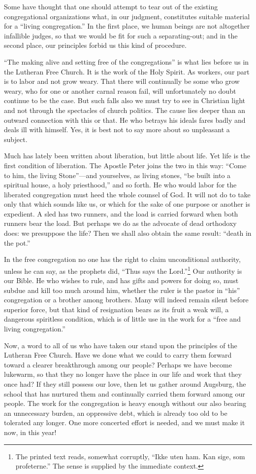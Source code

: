 Some have thought that one should attempt to tear out of the existing congregational organizations what, in our judgment, constitutes suitable material for a “living congregation.” In the first place, we human beings are not altogether infallible judges, so that we would be fit for such a separating-out; and in the second place, our principles forbid us this kind of procedure.

“The making alive and setting free of the congregations” is what lies before us in the Lutheran Free Church. It is the work of the Holy Spirit. As workers, our part is to labor and not grow weary. That there will continually be some who grow weary, who for one or another carnal reason fail, will unfortunately no doubt continue to be the case. But such falls also we must try to see in Christian light and not through the spectacles of church politics. The cause lies deeper than an outward connection with this or that. He who betrays his ideals fares badly and deals ill with himself. Yes, it is best not to say more about so unpleasant a subject.

Much has lately been written about liberation, but little about life. Yet life is the first condition of liberation. The Apostle Peter joins the two in this way: “Come to him, the living Stone”—and yourselves, as living stones, “be built into a spiritual house, a holy priesthood,” and so forth. He who would labor for the liberated congregation must heed the whole counsel of God. It will not do to take only that which sounds like us, or which for the sake of one purpose or another is expedient. A sled has two runners, and the load is carried forward when both runners bear the load. But perhaps we do as the advocate of dead orthodoxy does: we presuppose the life? Then we shall also obtain the same result: “death in the pot.”

In the free congregation no one has the right to claim unconditional authority, unless he can say, as the prophets did, ``Thus says the Lord.''\footnote{The printed text reads, somewhat corruptly, ``Ikke uten ham. Kan sige, som profeterne.'' The sense is supplied by the immediate context.} Our authority is our Bible. He who wishes to rule, and has gifts and powers for doing so, must subdue and kill too much around him, whether the ruler is the pastor in “his” congregation or a brother among brothers. Many will indeed remain silent before superior force, but that kind of resignation bears as its fruit a weak will, a dangerous spiritless condition, which is of little use in the work for a “free and living congregation.”

Now, a word to all of us who have taken our stand upon the principles of the Lutheran Free Church. Have we done what we could to carry them forward toward a clearer breakthrough among our people? Perhaps we have become lukewarm, so that they no longer have the place in our life and work that they once had? If they still possess our love, then let us gather around Augsburg, the school that has nurtured them and continually carried them forward among our people. The work for the congregation is heavy enough without our also bearing an unnecessary burden, an oppressive debt, which is already too old to be tolerated any longer. One more concerted effort is needed, and we must make it now, in this year!
